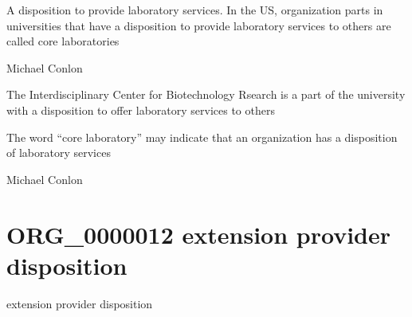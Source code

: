 \documentclass[letterpaper,10pt,english]{sphinxmanual}
\begin{document}
\begin{sphinxShadowBox}

\sphinxAtStartPar
A disposition to provide laboratory services.  In the US, organization parts in universities that have a disposition to provide laboratory services to others are called core laboratories
\end{sphinxShadowBox}

\begin{sphinxShadowBox}

\sphinxAtStartPar
Michael Conlon 
\end{sphinxShadowBox}

\begin{sphinxShadowBox}

\sphinxAtStartPar
The Interdisciplinary Center for Biotechnology Rsearch is a part of the university with a disposition to offer laboratory services to others
\end{sphinxShadowBox}

\begin{sphinxShadowBox}

\sphinxAtStartPar
The word “core laboratory” may indicate that an organization has a disposition of laboratory services
\end{sphinxShadowBox}

\begin{sphinxShadowBox}

\sphinxAtStartPar
Michael Conlon 
\end{sphinxShadowBox}
\begin{quote}
\label{\detokenize{doc-ORG_0000012:org-0000012}}\label{\detokenize{doc-ORG_0000012:extension-provider-disposition}}\label{\detokenize{doc-ORG_0000012:org-0000012}}
\ignorespaces \end{quote}


\section{ORG\_0000012 \sphinxhyphen{} extension provider disposition}
\label{\detokenize{doc-ORG_0000012:org-0000012-extension-provider-disposition}}\label{\detokenize{doc-ORG_0000012:index-0}}\label{\detokenize{doc-ORG_0000012::doc}}
\begin{sphinxShadowBox}

\sphinxAtStartPar
extension provider disposition
\end{sphinxShadowBox}
\end{document}
